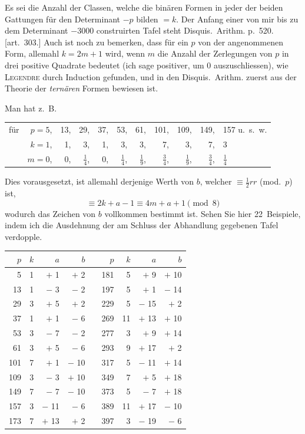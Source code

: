 \documentclass[10pt,a4paper]{article}
\begin{document}
Es sei die Anzahl der Classen, welche die bin\"aren Formen in jeder der beiden Gattungen f\"ur den Determinant $-p$ bilden $= k$. Der Anfang einer von mir bis zu dem Determinant $-3000$ construirten Tafel steht Disquis.~Arithm. p.~520. [art.~303.] Auch ist noch zu bemerken, dass f\"ur ein $p$ von der angenommenen Form, allemahl $k = 2m+1$ wird, wenn $m$ die Anzahl der Zerlegungen von $p$ in drei positive Quadrate bedeutet (ich sage positiver, um 0 auszuschliessen), wie \textsc{Legendre} durch Induction gefunden, und in den Disquis.~Arithm. zuerst aus der Theorie der \textit{tern\"aren} Formen bewiesen ist.

Man hat z.~B.
\begin{center}
\begin{tabular}{r r r r r r r r r r}
f\"ur & $p = 5$, & 13, & 29, & 37, & 53, & 61, & 101, & 109, & 149, & 157 u.~s.~w. \\
& $k = 1$, & 1, & 3, & 1, & 3, & 3, & 7, & 3, & 7, & 3 \\
& $m = 0$, & 0, & $\frac{1}{4}$, & 0, & $\frac{1}{4}$, & $\frac{1}{9}$, & $\frac{3}{4}$, & $\frac{1}{9}$, & $\frac{3}{4}$, & $\frac{1}{4}$ \\
\end{tabular}
\end{center}

Dies vorausgesetzt, ist allemahl derjenige Werth von $b$, welcher $\equiv \frac{1}{2}rr$ (mod.~$p$) ist,
\[
\equiv 2k + a - 1 \equiv 4m + a + 1 \pmod{8}
\]
wodurch das Zeichen von $b$ vollkommen bestimmt ist. Sehen Sie hier 22~Beispiele, indem ich die Ausdehnung der am Schluss der Abhandlung gegebenen Tafel verdopple.

\begin{center}
\begin{tabular}{r | r | r | r c r | r | r | r}
$p$ & $k$ & $a$ & $b$ & \quad & $p$ & $k$ & $a$ & $b$ \\
\hline
5 & 1 & $+$ 1 & $+$ 2 & & 181 & 5 & $+$ 9 & $+$ 10 \\
13 & 1 & $-$ 3 & $-$ 2 & & 197 & 5 & $+$ 1 & $-$ 14 \\
29 & 3 & $+$ 5 & $+$ 2 & & 229 & 5 & $-$ 15 & $+$ 2 \\
37 & 1 & $+$ 1 & $-$ 6 & & 269 & 11 & $+$ 13 & $+$ 10 \\
53 & 3 & $-$ 7 & $-$ 2 & & 277 & 3 & $+$ 9 & $+$ 14 \\
61 & 3 & $+$ 5 & $-$ 6 & & 293 & 9 & $+$ 17 & $+$ 2 \\
101 & 7 & $+$ 1 & $-$ 10 & & 317 & 5 & $-$ 11 & $+$ 14 \\
109 & 3 & $-$ 3 & $+$ 10 & & 349 & 7 & $+$ 5 & $+$ 18 \\
149 & 7 & $-$ 7 & $-$ 10 & & 373 & 5 & $-$ 7 & $+$ 18 \\
157 & 3 & $-$ 11 & $-$ 6 & & 389 & 11 & $+$ 17 & $-$ 10 \\
173 & 7 & $+$ 13 & $+$ 2 & & 397 & 3 & $-$ 19 & $-$ 6 \\
\end{tabular}
\end{center}
\end{document}
